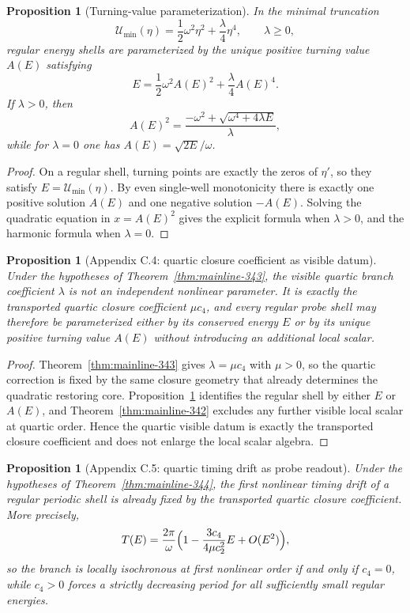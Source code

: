 \documentclass[12pt,a4paper]{article}
\newtheorem{proposition}[theorem]{Proposition}
\begin{document}
\begin{proposition}[Turning-value parameterization]
\label{prop:appendix-342b}
In the minimal truncation
\[
 \mathcal U_{\min}(\eta)=\frac12\omega^2\eta^2+\frac{\lambda}{4}\eta^4,
 \qquad \lambda\ge 0,
\]
regular energy shells are parameterized by the unique positive turning value $A(E)$ satisfying
\[
 E=\frac12\omega^2A(E)^2+\frac{\lambda}{4}A(E)^4.
\]
If $\lambda>0$, then
\[
 A(E)^2=\frac{-\omega^2+\sqrt{\omega^4+4\lambda E}}{\lambda},
\]
while for $\lambda=0$ one has $A(E)=\sqrt{2E}/\omega$.
\end{proposition}

\begin{proof}
On a regular shell, turning points are exactly the zeros of $\eta'$, so they satisfy $E=\mathcal U_{\min}(\eta)$. By even single-well monotonicity there is exactly one positive solution $A(E)$ and one negative solution $-A(E)$. Solving the quadratic equation in $x=A(E)^2$ gives the explicit formula when $\lambda>0$, and the harmonic formula when $\lambda=0$.
\end{proof}

\begin{proposition}[Appendix C.4: quartic closure coefficient as visible datum]
\label{prop:app-c-34-4}
Under the hypotheses of Theorem~\ref{thm:mainline-343}, the visible quartic branch coefficient $\lambda$ is not an independent nonlinear parameter. It is exactly the transported quartic closure coefficient $\mu c_4$, and every regular probe shell may therefore be parameterized either by its conserved energy $E$ or by its unique positive turning value $A(E)$ without introducing an additional local scalar.
\end{proposition}

\begin{proof}
Theorem~\ref{thm:mainline-343} gives $\lambda=\mu c_4$ with $\mu>0$, so the quartic correction is fixed by the same closure geometry that already determines the quadratic restoring core. Proposition~\ref{prop:appendix-342b} identifies the regular shell by either $E$ or $A(E)$, and Theorem~\ref{thm:mainline-342} excludes any further visible local scalar at quartic order. Hence the quartic visible datum is exactly the transported closure coefficient and does not enlarge the local scalar algebra.
\end{proof}


\begin{proposition}[Appendix C.5: quartic timing drift as probe readout]
\label{prop:app-c-34-5}
Under the hypotheses of Theorem~\ref{thm:mainline-344}, the first nonlinear timing drift of a regular periodic shell is already fixed by the transported quartic closure coefficient. More precisely,
\[
 T(E)=\frac{2\pi}{\omega}\Bigl(1-\frac{3c_4}{4\mu c_2^2}E+O(E^2)\Bigr),
\]
so the branch is locally isochronous at first nonlinear order if and only if $c_4=0$, while $c_4>0$ forces a strictly decreasing period for all sufficiently small regular energies.
\end{proposition}
\end{document}
